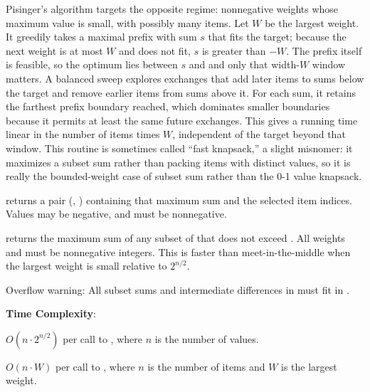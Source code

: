 Pisinger's algorithm targets the opposite regime: nonnegative weights whose maximum value is small, with possibly many items. Let $W$ be the largest weight. It greedily takes a maximal prefix with sum $s$ that fits the target; because the next weight is at most $W$ and does not fit, $s$ is greater than  $- W$. The prefix itself is feasible, so the optimum lies between $s$ and  and only that width-$W$ window matters. A balanced sweep explores exchanges that add later items to sums below the target and remove earlier items from sums above it. For each sum, it retains the farthest prefix boundary reached, which dominates smaller boundaries because it permits at least the same future exchanges. This gives a running time linear in the number of items times $W$, independent of the target beyond that window. This routine is sometimes called ``fast knapsack,'' a slight misnomer: it maximizes a subset sum rather than packing items with distinct values, so it is really the bounded-weight case of subset sum rather than the 0-1 value knapsack.

\begin{compactitem}
  \item {} returns a pair (, ) containing that maximum sum and the selected item indices. Values may be negative, and  must be nonnegative.
  \item {} returns the maximum sum of any subset of  that does not exceed . All weights and  must be nonnegative integers. This is faster than meet-in-the-middle when the largest weight is small relative to $2^{n/2}$.
\end{compactitem}

Overflow warning: All subset sums and intermediate differences in  must fit in .

\textbf{Time Complexity}:
\begin{compactitem}
  \item $O(n \cdot 2^{n/2})$ per call to , where $n$ is the number of values.
  \item $O(n \cdot W)$ per call to , where $n$ is the number of items and $W$ is the largest weight.
\end{compactitem}

